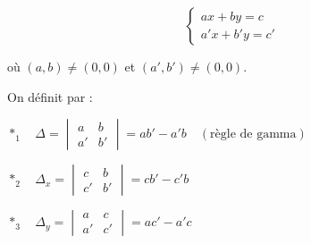 \documentclass[12pt,a4paper]{article}
\begin{document}
\[
\begin{cases}
ax + by = c \\
a'x + b'y = c'
\end{cases}
\]

où $(a,b) \neq (0,0)$ et $(a',b') \neq (0,0)$.


On définit par :

$*_{1} \quad \Delta = \begin{vmatrix} a & b \\ a' & b' \end{vmatrix} = ab' - a'b \quad (\text{règle de gamma})$

$*_{2} \quad \Delta_x = \begin{vmatrix} c & b \\ c' & b' \end{vmatrix} = cb' - c'b$

$*_{3} \quad \Delta_y = \begin{vmatrix} a & c \\ a' & c' \end{vmatrix} = ac' - a'c$

\end{document}
